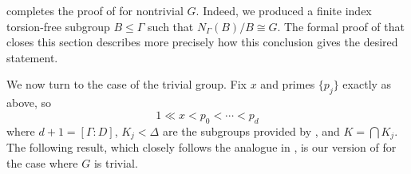 \documentclass[11pt]{article}
\theoremstyle{plain}
\theoremstyle{definition}
\theoremstyle{remark}
\newcommand{\Gam}{\Gamma}
\newcommand{\Del}{\Delta}
\begin{document}
 completes the proof of  for nontrivial $G$. Indeed, we produced a finite index torsion-free subgroup $B \le \Gam$ such that $N_\Gam(B) / B \cong G$. The formal proof of  that closes this section describes more precisely how this conclusion gives the desired statement.

We now turn to the case of the trivial group. Fix $x$ and primes $\{p_j\}$ exactly as above, so
\begin{equation}\label{eq:Redefine}
1 \ll x < p_0 < \cdots < p_d
\end{equation}
where $d + 1 = [\Gam : D]$, $K_j < \Del$ are the subgroups provided by , and $K = \bigcap K_j$. The following result, which closely follows the analogue in \cite{BelolipetskyLubotzky}, is our version of  for the case where $G$ is trivial.
\end{document}
